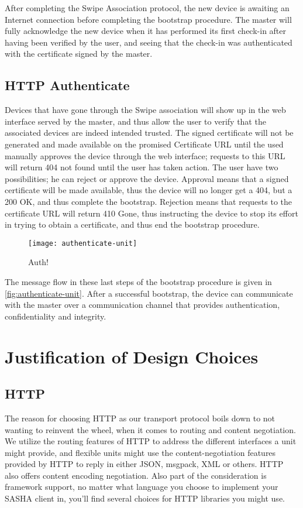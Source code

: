 After completing the Swipe Association protocol, the new device is awaiting an Internet connection before completing the bootstrap procedure. The master will fully acknowledge the new device when it has performed its first check-in after having been verified by the user, and seeing that the check-in was authenticated with the certificate signed by the master.

\subsection{HTTP Authenticate}
Devices that have gone through the Swipe association will show up in the web interface served by the master, and thus allow the user to verify that the associated devices are indeed intended trusted. The signed certificate will not be generated and made available on the promised Certificate URL until the used manually approves the device through the web interface; requests to this URL will return 404 not found until the user has taken action.
The user have two possibilities; he can reject or approve the device. Approval means that a signed certificate will be made available, thus the device will no longer get a 404, but a 200 OK, and thus complete the bootstrap. Rejection means that requests to the certificate URL will return 410 Gone, thus instructing the device to stop its effort in trying to obtain a certificate, and thus end the bootstrap procedure.

\begin{figure}[ht!]
    \centering
    \texttt{[image: authenticate-unit]}\label{fig:authenticate-unit}
    \caption{Auth!}
\end{figure}

The message flow in these last steps of the bootstrap procedure is given in \autoref{fig:authenticate-unit}. After a successful bootstrap, the device can communicate with the master over a communication channel that provides authentication, confidentiality and integrity.
\section{Justification of Design Choices}

\subsection{HTTP}
The reason for choosing HTTP as our transport protocol boils down to not wanting to reinvent the wheel, when it comes to routing and content negotiation. We utilize the routing features of HTTP to address the different interfaces a unit might provide, and flexible units might use the content-negotiation features provided by HTTP to reply in either JSON, msgpack, XML or others. HTTP also offers content encoding negotiation. Also part of the consideration is framework support, no matter what language you choose to implement your SASHA client in, you'll find several choices for HTTP libraries you might use.

